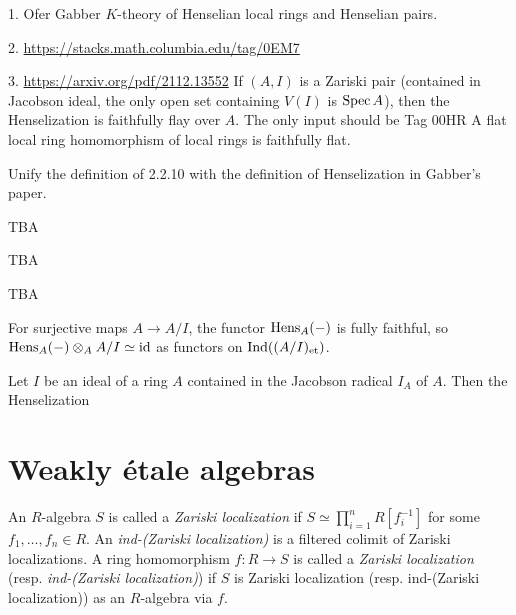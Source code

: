 1. Ofer Gabber \(K\)-theory of Henselian local rings and Henselian pairs.

2. \url{https://stacks.math.columbia.edu/tag/0EM7}

3. \url{https://arxiv.org/pdf/2112.13552} If \((A,I)\) is a Zariski pair (contained in Jacobson ideal, the only open set containing \(V(I)\) is \(\operatorname{Spec} A\)), then the Henselization is faithfully flay over \(A\). The only input should be Tag 00HR A flat local ring homomorphism of local rings is faithfully flat.

Unify the definition of 2.2.10 with the definition of Henselization in Gabber's paper.

\begin{definition}
    \label{def:henselian-pair}

    TBA
\end{definition}

\begin{definition}
    \label{def:henselization}

    TBA

\end{definition}

\begin{theorem}
    \label{thm:henselization-is-henselian}
    TBA

\end{theorem}

\begin{lemma}
    \label{lem:henselization-fully-faithful}

    For surjective maps $A \to A/I$, the functor $\operatorname{Hens}_A(-)$ is fully faithful, so $\operatorname{Hens}_A(-) \otimes_A A/I \simeq \mathrm{id}$ as functors on $\mathrm{Ind}((A/I)_{\mathrm{et}})$.
\end{lemma}

\begin{lemma}
    Let \(I\) be an ideal of a ring \(A\) contained in the Jacobson radical \(I_A\) of \(A\). Then the Henselization 
\end{lemma}

\section{Weakly étale algebras}

\begin{definition}
    \label{def:ind-zariski-localization}

    An $R$-algebra $S$ is called a \textit{Zariski localization} if $S \simeq \prod_{i=1}^n R[f_i^{-1}]$ for some $f_1,\dots,f_n \in R$. An \textit{ind-(Zariski localization)} is a filtered colimit of Zariski localizations. A ring homomorphism $f : R \to S$ is called a \textit{Zariski localization} (resp. \emph{ind-(Zariski localization)}) if $S$ is Zariski localization (resp. ind-(Zariski localization)) as an $R$-algebra via $f$.
\end{definition}

